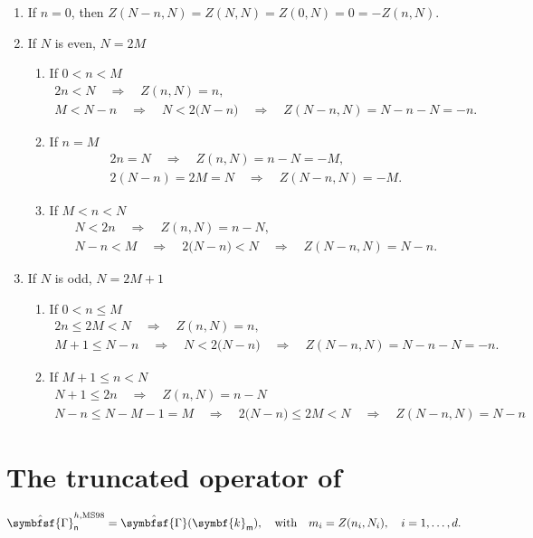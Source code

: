 \documentclass[draft, appendixprefix=true, chapterprefix=true, fontsize=12pt, numbers=noendperiod]{scrbook}
\newcommand{\tens}[1]{\symbfsf{#1}}
\renewcommand{\vec}[1]{\symbf{#1}}
\newcommand{\tuple}[1]{\mathsf{#1}}
\begin{document}
\begin{enumerate}
\item If \(n=0\), then \(Z(N-n, N)=Z(N, N)=Z(0, N)=0=-Z(n, N)\).
\item If \(N\) is even, \(N=2M\)
  \begin{enumerate}
  \item If \(0<n<M\)
    \begin{gather*}
      2n<N\quad\Rightarrow\quad Z(n, N)=n,\\
      M<N-n\quad\Rightarrow\quad N<2\bigl(N-n\bigr)\quad\Rightarrow\quad Z(N-n, N)=N-n-N=-n.
    \end{gather*}
  \item If \(n=M\)
    \begin{gather*}
      2n=N\quad\Rightarrow\quad Z(n, N)=n-N=-M,\\
      2(N-n)=2M=N\quad\Rightarrow\quad Z(N-n, N)=-M.
    \end{gather*}
  \item If \(M<n<N\)
    \begin{gather*}
      N<2n\quad\Rightarrow\quad Z(n, N)=n-N,\\
     N-n<M\quad\Rightarrow\quad 2\bigl(N-n\bigr)<N\quad\Rightarrow\quad Z(N-n, N)=N-n.
    \end{gather*}
  \end{enumerate}
\item If \(N\) is odd, \(N=2M+1\)
  \begin{enumerate}
  \item If \(0<n\leq M\)
    \begin{gather*}
      2n\leq 2M<N\quad\Rightarrow\quad Z(n, N)=n,\\
      M+1\leq N-n\quad\Rightarrow\quad N<2\bigl(N-n\bigr)\quad\Rightarrow\quad Z(N-n, N)=N-n-N=-n.
    \end{gather*}
  \item If \(M+1\leq n<N\)
    \begin{gather*}
      N+1\leq 2n\quad\Rightarrow\quad Z(n, N)=n-N\\
      N-n\leq N-M-1=M\quad\Rightarrow\quad 2\bigl(N-n\bigr)\leq 2M<N\quad\Rightarrow\quad Z(N-n, N)=N-n
    \end{gather*}
  \end{enumerate}
\end{enumerate}


\section{The truncated operator of \textcite{moul1998}}

\begin{equation}
  \hat{\tens\Gamma}_{\tuple{n}}^{h, \mathrm{MS98}}=\hat{\tens\Gamma}(\vec k_{\tuple{m}}),\quad\text{with}\quad
  m_i=Z(n_i, N_i),\quad i=1,\ldots, d.
\end{equation}


\printbibliography
\end{document}
